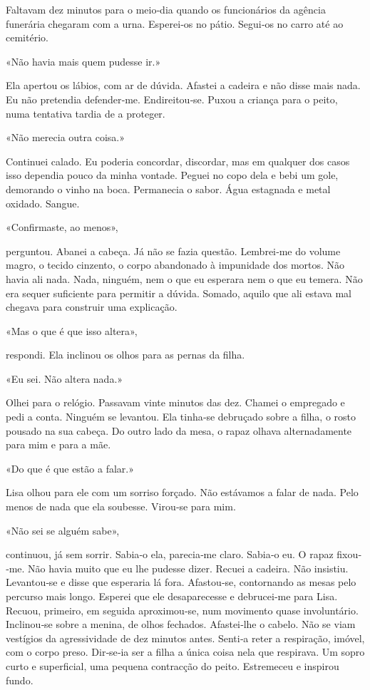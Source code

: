 Faltavam dez minutos para o meio­‑dia quando os funcionários da agência
funerária chegaram com a urna. Esperei­‑os no pátio. Segui­‑os no carro
até ao cemitério.

«Não havia mais quem pudesse ir.»

Ela apertou os lábios, com ar de dúvida. Afastei a cadeira e não disse
mais nada. Eu não pretendia defender­‑me. Endireitou­‑se. Puxou a
criança para o peito, numa tentativa tardia de a proteger.

«Não merecia outra coisa.»

Continuei calado. Eu poderia concordar, discordar, mas em qualquer dos
casos isso dependia pouco da minha vontade. Peguei no copo dela e bebi
um gole, demorando o vinho na boca. Permanecia o sabor. Água estagnada e
metal oxidado. Sangue.

«Confirmaste, ao menos»,

perguntou. Abanei a cabeça. Já não se fazia questão. Lembrei­‑me do
volume magro, o tecido cinzento, o corpo abandonado à impunidade dos
mortos. Não havia ali nada. Nada, ninguém, nem o que eu esperara nem o
que eu temera. Não era sequer suficiente para permitir a dúvida. Somado,
aquilo que ali estava mal chegava para construir uma explicação.

«Mas o que é que isso altera»,

respondi. Ela inclinou os olhos para as pernas da filha.

«Eu sei. Não altera nada.»

Olhei para o relógio. Passavam vinte minutos das dez. Chamei o empregado
e pedi a conta. Ninguém se levantou. Ela tinha­‑se debruçado sobre a
filha, o rosto pousado na sua cabeça. Do outro lado da mesa, o rapaz
olhava alternadamente para mim e para a mãe.

«Do que é que estão a falar.»

Lisa olhou para ele com um sorriso forçado. Não estávamos a falar de
nada. Pelo menos de nada que ela soubesse. Virou­‑se para mim.

«Não sei se alguém sabe»,

continuou, já sem sorrir. Sabia­‑o ela, parecia­‑me claro. Sabia­‑o eu.
O rapaz fixou­‑me. Não havia muito que eu lhe pudesse dizer. Recuei a
cadeira. Não insistiu. Levantou­‑se e disse que esperaria lá fora.
Afastou­‑se, contornando as mesas pelo percurso mais longo. Esperei que
ele desaparecesse e debrucei­‑me para Lisa. Recuou, primeiro, em seguida
aproximou­‑se, num movimento quase involuntário. Inclinou­‑se sobre a
menina, de olhos fechados. Afastei­‑lhe o cabelo. Não se viam vestígios
da agressividade de dez minutos antes. Senti­‑a reter a respiração,
imóvel, com o corpo preso. Dir­‑se­‑ia ser a filha a única coisa nela
que respirava. Um sopro curto e superficial, uma pequena contracção do
peito. Estremeceu e inspirou fundo.

